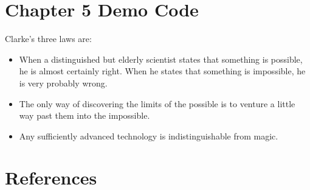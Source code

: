 \documentclass[12pt, a4paper]{article}
\begin{document}
\newpage

\section{Chapter 5 Demo Code}
Clarke's three laws are:
\begin{itemize}
  \item When a distinguished but elderly scientist states that something is possible, he is almost certainly right. When he states that something is impossible, he is very probably wrong.
  \item The only way of discovering the limits of the possible is to venture a little way past them into the impossible.
  \item Any sufficiently advanced technology is indistinguishable from magic.
\end{itemize}

\section* {References}
\end{document}
